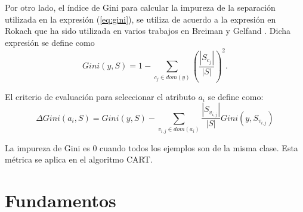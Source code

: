 \documentclass[
10pt, %
a4paper, %
]{article}
\begin{document}
%

Por otro lado, el índice de Gini para calcular la impureza de la separación utilizada en la expresión (\ref{eq:gini}), se utiliza de acuerdo a la expresión en Rokach
\cite{rokach} que ha sido utilizada en varios trabajos en Breiman \cite{breiman2017classification} y Gelfand \cite{gelfand}. Dicha expresión se define como
\begin{equation*}
	Gini(y,S) = 1 - \sum_{c_j\in dom(y)}\left(\dfrac{|S_{c_j}|}{|S|} \right)^2.
\end{equation*}

El criterio de evaluación para seleccionar el atributo $a_i$ se define como:
\begin{equation*}
	\Delta Gini(a_i,S) = Gini(y,S) - \sum_{{v_{i,j}}\in dom(a_i)}\dfrac{|S_{v_{i,j}}|}{|S|}Gini(y,S_{v_{i,j}})
\end{equation*}

La impureza de Gini es 0 cuando todos los ejemplos son de la misma clase. Esta métrica se aplica en el algoritmo CART\cite{breiman2017classification}. 

\section{Fundamentos}
\end{document}
